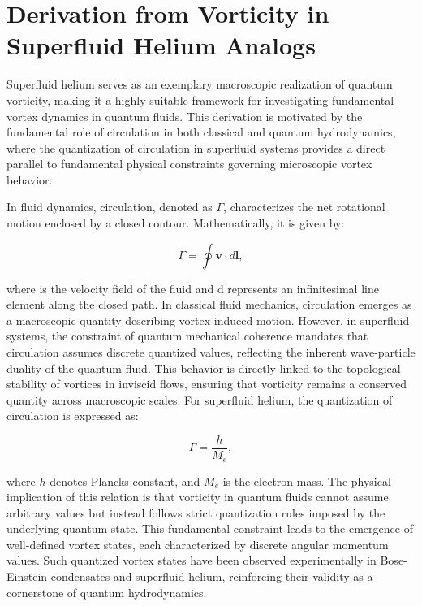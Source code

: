 \section*{Derivation from Vorticity in Superfluid Helium Analogs}

Superfluid helium serves as an exemplary macroscopic realization of quantum vorticity, making it a highly suitable framework for investigating fundamental vortex dynamics in quantum fluids. This derivation is motivated by the fundamental role of circulation in both classical and quantum hydrodynamics, where the quantization of circulation in superfluid systems provides a direct parallel to fundamental physical constraints governing microscopic vortex behavior.


In fluid dynamics, circulation, denoted as $\Gamma$, characterizes the net rotational motion enclosed by a closed contour. Mathematically, it is given by:

\begin{equation*}
\Gamma = \oint \mathbf{v} \cdot d\mathbf{l},
\label{eq:circulation_definition}
\end{equation*}

where  is the velocity field of the fluid and d represents an infinitesimal line element along the closed path. In classical fluid mechanics, circulation emerges as a macroscopic quantity describing vortex-induced motion. However, in superfluid systems, the constraint of quantum mechanical coherence mandates that circulation assumes discrete quantized values, reflecting the inherent wave-particle duality of the quantum fluid. This behavior is directly linked to the topological stability of vortices in inviscid flows, ensuring that vorticity remains a conserved quantity across macroscopic scales. For superfluid helium, the quantization of circulation is expressed as:

\begin{equation*}
\Gamma = \frac{h}{M_e},
\label{eq:circulation}
\end{equation*}

where $h$ denotes Planck\rqs s constant, and  $ M_e $ is the electron mass. The physical implication of this relation is that vorticity in quantum fluids cannot assume arbitrary values but instead follows strict quantization rules imposed by the underlying quantum state. This fundamental constraint leads to the emergence of well-defined vortex states, each characterized by discrete angular momentum values. Such quantized vortex states have been observed experimentally in Bose-Einstein condensates and superfluid helium, reinforcing their validity as a cornerstone of quantum hydrodynamics.


